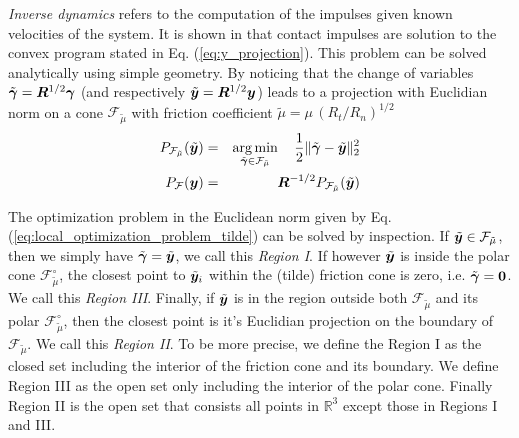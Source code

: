 
\textit{Inverse dynamics} refers to the computation of the impulses given known
velocities of the system. It is shown in \cite{bib:todorov2014} that contact
impulses are solution to the convex program stated in Eq.
(\ref{eq:y_projection}). This problem can be solved analytically using simple
geometry. By noticing that the change of variables
$\tilde{{\bm\gamma}}={\bm{R}}^{1/2}{\bm\gamma}$ (and respectively
$\tilde{{\bm{y}}}={\bm{R}}^{1/2}{\bm{y}}$) leads to a projection with Euclidian norm
on a cone $\mathcal{F}_{\tilde\mu}$ with friction coefficient
$\tilde\mu=\mu\,(R_t/R_n)^{1/2}$
\begin{eqnarray}
	P_\mathcal{F_{\tilde\mu}}(\tilde{\vf{y}})&=&\argmin_{\tilde\bgamma\in\mathcal{F_{\tilde\mu}}}
		\quad \frac{1}{2}\Vert\tilde\bgamma-\tilde{\vf{y}}\Vert_2^2\nonumber\\
	P_\mathcal{F}(\vf{y}) &=&
	\vf{R}^{-1/2}P_\mathcal{F_{\tilde\mu}}(\tilde{\vf{y}})
	\label{eq:local_optimization_problem_tilde}
\end{eqnarray}

The optimization problem in the Euclidean norm given by Eq.
(\ref{eq:local_optimization_problem_tilde}) can be solved by inspection. If
$\tilde{{\bm{y}}}\in\mathcal{F}_{\tilde\mu}$, then we simply have $\tilde{{\bm\gamma}}
= \tilde{{\bm{y}}}$, we call this \textit{Region I}. If however $\tilde{{\bm{y}}}$
is inside the polar cone $\mathcal{F}_{\tilde\mu}^\circ$, the closest point to
$\tilde{{\bm{y}}}_i$ within the (tilde) friction cone is zero, i.e.
$\tilde{{\bm\gamma}} ={\bm{0}}$. We call this \textit{Region III}. Finally, if
$\tilde{{\bm{y}}}$ is in the region outside both $\mathcal{F}_{\tilde\mu}$ and its
polar $\mathcal{F}_{\tilde\mu}^\circ$, then the closest point is it's Euclidian
projection on the boundary of $\mathcal{F}_{\tilde\mu}$. We call this
\textit{Region II}. To be more precise, we define the Region I as the closed set
including the interior of the friction cone and its boundary. We define Region
III as the open set only including the interior of the polar cone. Finally
Region II is the open set that consists all points in $\mathbb{R}^3$ except
those in Regions I and III.

